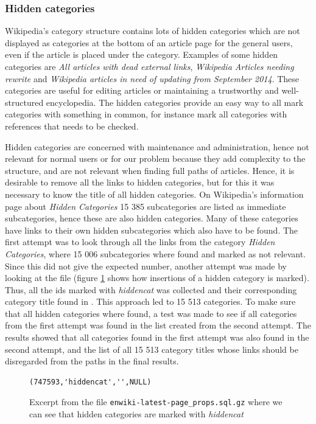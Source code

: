 \subsubsection{Hidden categories}
Wikipedia's category structure contains lots of hidden categories which are not displayed as categories at the bottom of an article page for the general users, even if the article is placed under the category. Examples of some hidden categories are \emph{All articles with dead external links}, \emph{Wikipedia Articles needing rewrite} and \emph{Wikipedia articles in need of updating from September 2014}. These categories are useful for editing articles or maintaining a trustworthy and well-structured encyclopedia. The hidden categories provide an easy way to all mark categories with something in common, for instance mark all categories with references that needs to be checked. 

Hidden categories are concerned with maintenance and administration, hence not relevant for normal users or for our problem because they add complexity to the structure, and are not relevant when finding full paths of articles. Hence, it is desirable to remove all the links to hidden categories, but for this it was necessary to know the title of all hidden categories.  On Wikipedia's information page about \emph{Hidden Categories}\cite{wiki:hiddencat} 15 385 subcategories are listed as immediate subcategories, hence these are also hidden categories. Many of these categories have links to their own hidden subcategories which also have to be found. The first attempt was to look through all the links from the category \emph{Hidden Categories}, where 15 006 subcategories where found and marked as not relevant. Since this did not give the expected number, another attempt was made by looking at the file \enwikipageprops (figure \ref{fig:pageprops} shows how insertions of a  hidden category is marked). Thus, all the ids marked with \emph{hiddencat} was collected and their corresponding category title found in \enwikipage. This approach led to 15 513 categories. To make sure that all hidden categories where found, a test was made to see if all categories from the first attempt was found in the list created from the second attempt. The results showed that all categories found in the first attempt was also found in the second attempt, and the list of all 15 513 category titles whose links should be disregarded from the paths in the final results. 

\begin{figure}[h]
\centering
\begin{lstlisting}
(747593,'hiddencat','',NULL)
\end{lstlisting}
\caption[Insert statement for hidden category]{Excerpt from the file \texttt{enwiki-latest-page\_props.sql.gz} where we can see that hidden categories are marked with \emph{hiddencat}}
\label{fig:pageprops}
\end{figure}

